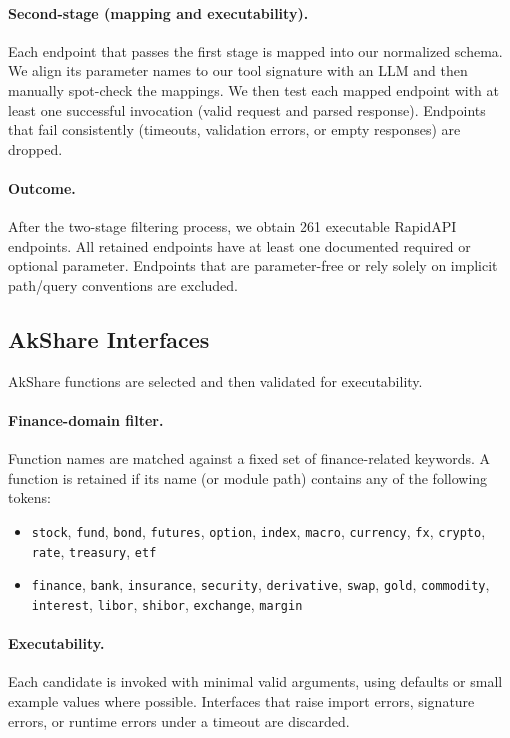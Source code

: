 \paragraph{Second-stage (mapping and executability).}
Each endpoint that passes the first stage is mapped into our normalized schema.
We align its parameter names to our tool signature with an LLM and then manually spot-check the mappings.
We then test each mapped endpoint with at least one successful invocation (valid request and parsed response).
Endpoints that fail consistently (timeouts, validation errors, or empty responses) are dropped.

\paragraph{Outcome.}
After the two-stage filtering process, we obtain 261 executable RapidAPI endpoints.
All retained endpoints have at least one documented required or optional parameter.
Endpoints that are parameter-free or rely solely on implicit path/query conventions are excluded.


\subsection{AkShare Interfaces}

AkShare functions are selected and then validated for executability.

\paragraph{Finance-domain filter.}
Function names are matched against a fixed set of finance-related keywords.
A function is retained if its name (or module path) contains any of the following tokens:
\begin{itemize}[leftmargin=*,nosep]
\item \texttt{stock}, \texttt{fund}, \texttt{bond}, \texttt{futures}, \texttt{option}, \texttt{index}, \texttt{macro}, \texttt{currency}, \texttt{fx}, \texttt{crypto}, \texttt{rate}, \texttt{treasury}, \texttt{etf}
\item \texttt{finance}, \texttt{bank}, \texttt{insurance}, \texttt{security}, \texttt{derivative}, \texttt{swap}, \texttt{gold}, \texttt{commodity}, \texttt{interest}, \texttt{libor}, \texttt{shibor}, \texttt{exchange}, \texttt{margin}
\end{itemize}

\paragraph{Executability.}
Each candidate is invoked with minimal valid arguments, using defaults or small example values where possible.
Interfaces that raise import errors, signature errors, or runtime errors under a timeout are discarded.

